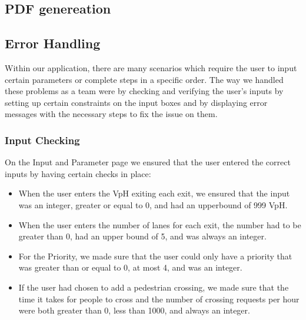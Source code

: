 \documentclass{article}
\begin{document}
    \subsection{PDF genereation}

    \subsection{Error Handling}
    Within our application, there are many scenarios which require the user to input certain parameters or complete steps in a specific order. The way we handled these problems as a team were by checking and verifying the user's inputs by setting up certain constraints on the input boxes and by displaying error messages with the necessary steps to fix the issue on them.
    \subsubsection{Input Checking}
    On the Input and Parameter page we ensured that the user entered the correct inputs by having certain checks in place:
    \begin{itemize}
        \item When the user enters the VpH exiting each exit, we ensured that the input was an integer, greater or equal to 0, and had an upperbound of 999 VpH.
        \item When the user enters the number of lanes for each exit, the number had to be greater than 0, had an upper bound of 5, and was always an integer.
        \item For the Priority, we made sure that the user could only have a priority that was greater than or equal to 0, at most 4, and was an integer.
        \item If the user had chosen to add a pedestrian crossing, we made sure that the time it takes for people to cross and the number of crossing requests per hour were both greater than 0, less than 1000, and always an integer.
    \end{itemize}
\end{document}
